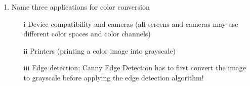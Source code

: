 \documentclass[../main.tex]{subfiles}
\begin{document}
\begin{enumerate}
    \item Name three applications for color conversion
    
    \begin{enumerate}
        \item [i] Device compatibility and cameras (all screens and cameras may use different
            color spaces and color channels)
        \item [ii] Printers (printing a color image into grayscale)
        \item [iii] Edge detection; Canny Edge Detection has to first convert the image to grayscale
            before applying the edge detection algorithm!
    \end{enumerate}
\end{enumerate}
\end{document}
